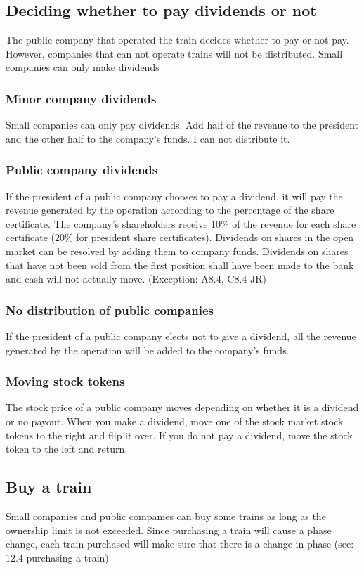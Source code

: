 \documentclass{article}
\begin{document}
\begin{CJK}{UTF8}{min}
\subsection{Deciding whether to pay dividends or not}
The public company that operated the train decides whether to pay or
not pay. However, companies that can not operate trains will not be
distributed. Small companies can only make dividends

\subsubsection{Minor company dividends}
Small companies can only pay dividends. Add half of the revenue to the
president and the other half to the company's funds. I can not
distribute it.

\subsubsection{Public company dividends}
If the president of a public company chooses to pay a dividend, it
will pay the revenue generated by the operation according to the
percentage of the share certificate. The company's shareholders
receive 10\% of the revenue for each share certificate (20\% for
president share certificates). Dividends on shares in the open market
can be resolved by adding them to company funds. Dividends on shares
that have not been sold from the first position shall have been made
to the bank and cash will not actually move.  (Exception: A8.4, C8.4
JR)

\subsubsection{No distribution of public companies}
If the president of a public company elects not to give a dividend,
all the revenue generated by the operation will be added to the
company's funds.

\subsubsection{Moving stock tokens}
The stock price of a public company moves depending on whether it is a
dividend or no payout. When you make a dividend, move one of the stock
market stock tokens to the right and flip it over. If you do not pay a
dividend, move the stock token to the left and return.

\subsection{Buy a train}
Small companies and public companies can buy some trains as long as
the ownership limit is not exceeded. Since purchasing a train will
cause a phase change, each train purchased will make sure that there
is a change in phase (see: 12.4 purchasing a train)


\end{CJK}
\end{document}
